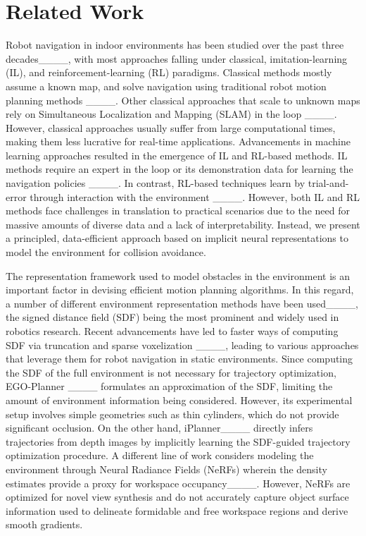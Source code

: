\section{Related Work}
Robot navigation in indoor environments has been studied over the past three decades____, with most approaches falling under classical, imitation-learning (IL), and reinforcement-learning (RL) paradigms.
Classical methods mostly assume a known map, and solve navigation using traditional robot motion planning methods ____.
Other classical approaches that scale to unknown maps rely on Simultaneous Localization and Mapping (SLAM) in the loop ____.
However, classical approaches usually suffer from large computational times, making them less lucrative for real-time applications.
Advancements in machine learning approaches resulted in the emergence of IL and RL-based methods. 
IL methods require an expert in the loop or its demonstration data for learning the navigation policies ____.
In contrast, RL-based techniques learn by trial-and-error through interaction with the environment ____.
However, both IL and RL methods face challenges in translation to practical scenarios due to the need for massive amounts of diverse data and a lack of interpretability.
Instead, we present a principled, data-efficient approach based on implicit neural representations to model the environment for collision avoidance.

The representation framework used to model obstacles in the environment is an important factor in devising efficient motion planning algorithms.
In this regard, a number of different environment representation methods have been used____, the signed distance field (SDF) being the most prominent and widely used in robotics research.
Recent advancements have led to faster ways of computing SDF via truncation and sparse voxelization ____, leading to various approaches that leverage them for robot navigation in static environments.
Since computing the SDF of the full environment is not necessary for trajectory optimization, EGO-Planner ____ formulates an approximation of the SDF, limiting the amount of environment information being considered.
However, its experimental setup involves simple geometries such as thin cylinders, which do not provide significant occlusion.
On the other hand, iPlanner____ directly infers trajectories from depth images by implicitly learning the SDF-guided trajectory optimization procedure.
A different line of work considers modeling the environment through Neural Radiance Fields (NeRFs) wherein the density estimates provide a proxy for workspace occupancy____.
However, NeRFs are optimized for novel view synthesis and do not accurately capture object surface information used to delineate formidable and free workspace regions and derive smooth gradients.

